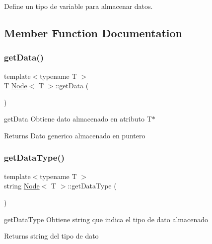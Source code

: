 Define un tipo de variable para almacenar datos. 

\subsection{Member Function Documentation}
\mbox{\label{class_node_a0c3315ee2e897e2a6e1c24aeca20aeb9}} 
\subsubsection{\texorpdfstring{get\+Data()}{getData()}}
{\footnotesize\ttfamily template$<$typename T $>$ \\
T \hyperlink{class_node}{Node}$<$ T $>$\+::get\+Data (\begin{DoxyParamCaption}{ }\end{DoxyParamCaption})}



get\+Data Obtiene dato almacenado en atributo T$\ast$ 

\begin{DoxyReturn}{Returns}
Dato generico almacenado en puntero 
\end{DoxyReturn}
\mbox{\label{class_node_a86ff212da630a11b4a32ecccd26f9c4d}} 
\subsubsection{\texorpdfstring{get\+Data\+Type()}{getDataType()}}
{\footnotesize\ttfamily template$<$typename T $>$ \\
string \hyperlink{class_node}{Node}$<$ T $>$\+::get\+Data\+Type (\begin{DoxyParamCaption}{ }\end{DoxyParamCaption})}



get\+Data\+Type Obtiene string que indica el tipo de dato almacenado 

\begin{DoxyReturn}{Returns}
string del tipo de dato 
\end{DoxyReturn}
\mbox{\label{class_node_a9735167ada11a354936bd597c56d6eb5}} 
